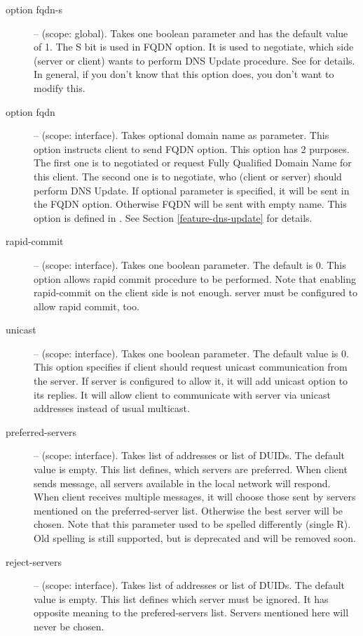 \begin{description}
\item[option fqdn-s] -- (scope: global). Takes one boolean parameter
  and has the default value of 1. The S bit is used in FQDN option. It
  is used to negotiate, which side (server or client) wants to perform
  DNS Update procedure. See \cite{rfc4704} for details. In general, if
  you don't know that this option does, you don't want to modify this.

\item[option fqdn] -- (scope: interface). Takes optional domain
   name as parameter. This option instructs client to send FQDN
   option. This option has 2 purposes. The first one is to negotiated
   or request Fully Qualified Domain Name for this client. The second
   one is to negotiate, who (client or server) should perform DNS
   Update. If optional parameter is specified, it will be sent in the
   FQDN option. Otherwise FQDN will be sent with empty name. This
   option is defined in \cite{rfc4704}. See
   Section \ref{feature-dns-update} for details.

 \item[rapid-commit] -- (scope: interface). Takes one boolean
   parameter. The default is 0. This option allows rapid commit
   procedure to be performed. Note that enabling rapid-commit on the
   client side is not enough. server must be configured to allow rapid
   commit, too.

 \item[unicast] -- (scope: interface). Takes one boolean
  parameter. The default value is 0. This option specifies if client
  should request unicast communication from the server. If server is
  configured to allow it, it will add unicast option to its
  replies. It will allow client to communicate with server via unicast
  addresses instead of usual multicast.

 \item[preferred-servers] -- (scope: interface). Takes list of
  addresses or list of DUIDs. The default value is empty.  This list
  defines, which servers are preferred. When client sends 
  message, all servers available in the local network will
  respond. When client receives multiple  messages, it
  will choose those sent by servers mentioned on the preferred-server
  list. Otherwise the best server will be chosen. Note that this
  parameter used to be spelled differently (single R). Old spelling
  is still supported, but is deprecated and will be removed soon.

 \item[reject-servers] -- (scope: interface). Takes list of addresses
  or list of DUIDs. The default value is empty. This list defines
  which server must be ignored. It has opposite meaning to the
  prefered-servers list. Servers mentioned here will never be chosen.


\end{description}
